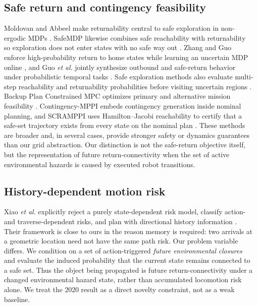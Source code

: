 \documentclass[conference]{IEEEtran}
\begin{document}
\subsection{Safe return and contingency feasibility}
Moldovan and Abbeel make returnability central to safe exploration in non-ergodic MDPs \cite{moldovan2012safe}. SafeMDP likewise combines safe reachability with returnability so exploration does not enter states with no safe way out \cite{turchetta2016safemdp}. Zhang and Guo enforce high-probability return to home states while learning an uncertain MDP online \cite{zhang2022online}, and Guo \emph{et al.} jointly synthesize outbound and safe-return behavior under probabilistic temporal tasks \cite{guo2023safereturn}. Safe exploration methods also evaluate multi-step reachability and returnability probabilities before visiting uncertain regions \cite{stephens2024safeexploration}. Backup Plan Constrained MPC optimizes primary and alternative mission feasibility \cite{tao2024backup}. Contingency-MPPI embeds contingency generation inside nominal planning, and SCRAMPPI uses Hamilton--Jacobi reachability to certify that a safe-set trajectory exists from every state on the nominal plan \cite{jung2025contingency,srirangam2026scramppi}. These methods are broader and, in several cases, provide stronger safety or dynamics guarantees than our grid abstraction. Our distinction is not the safe-return objective itself, but the representation of future return-connectivity when the set of active environmental hazards is caused by executed robot transitions.

\subsection{History-dependent motion risk}
Xiao \emph{et al.} explicitly reject a purely state-dependent risk model, classify action- and traverse-dependent risks, and plan with directional history information \cite{xiao2020risk}. Their framework is close to ours in the reason memory is required: two arrivals at a geometric location need not have the same path risk. Our problem variable differs. We condition on a set of action-triggered \emph{future environmental closures} and evaluate the induced probability that the current state remains connected to a safe set. Thus the object being propagated is future return-connectivity under a changed environmental hazard state, rather than accumulated locomotion risk alone. We treat the 2020 result as a direct novelty constraint, not as a weak baseline.
\end{document}
